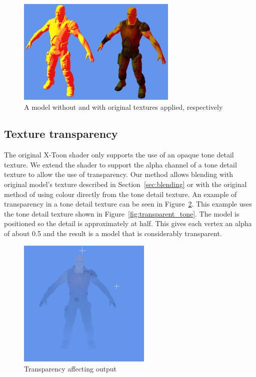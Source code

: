 \documentclass[annual]{acmsiggraph}
\begin{document}
\begin{figure}[h]
	\centering
	\includegraphics[width=3.0in]{images/textures}
	\caption{A model without and with original textures applied, respectively}
	\label{fig:texturing}
\end{figure}

\subsection{Texture transparency}
\label{sec:transparency}
The original X-Toon shader only supports the use of an opaque tone detail texture. We extend the shader to support the alpha channel of a tone detail texture to allow the use of transparency. Our method allows blending with original model's texture described in Section~\ref{sec:blending} or with the original method of using colour directly from the tone detail texture. An example of transparency in a tone detail texture can be seen in Figure~\ref{fig:transparency}. This example uses the tone detail texture shown in Figure~\ref{fig:transparent_tone}. The model is positioned so the detail is approximately at half. This gives each vertex an alpha of about 0.5 and the result is a model that is considerably transparent.

\begin{figure}[h]
	\centering
	\includegraphics[width=2.5in]{images/transparency}
	\caption{Transparency affecting output}
	\label{fig:transparency}
\end{figure}
\end{document}
